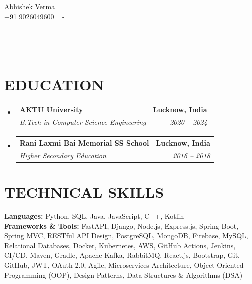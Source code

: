 \documentclass[letterpaper,11pt]{article}
\makeatletter
\newcommand{\resumeSubheading}[4]{\vspace{-2pt}\item\begin{tabular*}{1.0\textwidth}[t]{l@{\extracolsep{\fill}}r}\textbf{\large#1} & \textbf{\small #2} \\\textit{\large#3} & \textit{\small #4} \\\end{tabular*}\vspace{-7pt}}
\newcommand{\resumeSubHeadingListStart}{\begin{itemize}[leftmargin=0.0in, label={}]}
\newcommand{\resumeSubHeadingListEnd}{\end{itemize}}
\makeatother
\begin{document}
\begin{center}
    {\huge Abhishek Verma} \\ \vspace{2pt} 
    {+91 9026049600} ~ \small{-}
    \href{mailto:abhishek1pw@gmail.com}{\color{blue}{abhishek1pw@gmail.com}}
    
    ~ \small{-} \href{https://linkedin.com/in/abhishek-verma-profile}{\color{blue}{linkedin.com/in/abhishek-verma-profile}} 
    
    
    ~ \small{-} \href{https://github.com/abhishek-verma-github}{\color{blue}{github.com/abhishek-verma-github}}
    
\end{center}

\section{\color{airforceblue}EDUCATION}
  \resumeSubHeadingListStart
    
    \resumeSubheading{AKTU University}{Lucknow, India}{B.Tech in Computer Science Engineering}{2020 -- 2024}
    
    \resumeSubheading{Rani Laxmi Bai Memorial SS School}{Lucknow, India}{Higher Secondary Education}{2016 -- 2018}
    
  \resumeSubHeadingListEnd

\section{\color{airforceblue}TECHNICAL SKILLS}
 \begin{itemize}[leftmargin=0in, label={}]
    \small{\item{
     
     \textbf{\normalsize{Languages:}}{ \normalsize{Python, SQL, Java, JavaScript, C++, Kotlin}} \\
     
     \textbf{\normalsize{Frameworks \& Tools:}}{ \normalsize{FastAPI, Django, Node.js, Express.js, Spring Boot, Spring MVC, RESTful API Design, PostgreSQL, MongoDB, Firebase, MySQL, Relational Databases, Docker, Kubernetes, AWS, GitHub Actions, Jenkins, CI/CD, Maven, Gradle, Apache Kafka, RabbitMQ, React.js, Bootstrap, Git, GitHub, JWT, OAuth 2.0, Agile, Microservices Architecture, Object-Oriented Programming (OOP), Design Patterns, Data Structures \& Algorithms (DSA)}} \\
     
     }}
 \end{itemize}
 
\end{document}
